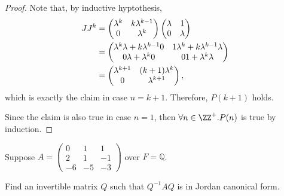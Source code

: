 \documentclass[11pt]{scrartcl}
\begin{document}
\begin{proof}
Note that, by inductive hyptothesis,
\begin{align}
J J^k                                         & = 
        \begin{pmatrix} 
      \lambda^k                               & k\lambda^{k-1}                     \\
      0                                       & \lambda^k
    \end{pmatrix}\left(\begin{matrix} \lambda & 1                                  \\ 0 & 
    \lambda\end{matrix}\right)                                                     \\
                                              & = 
  \begin{pmatrix}
    \lambda^k\lambda +k\lambda^{k-1}\* 0      & 1\*\lambda^k+k\lambda^{k-1}\lambda \\
    0\* \lambda+\lambda^k\* 0                 & 0\*1 + \lambda^k\lambda
  \end{pmatrix}\\
&=
  \begin{pmatrix}
\lambda^{k+1} & (k+1)\lambda^{k}\\
0 & \lambda^{k+1}
  \end{pmatrix},
\end{align}
which is exactly the claim in case $n=k+1$. Therefore, $P(k+1)$ holds.

Since the claim is also true in case $n=1$, then $\forall n \in \ZZ^+. P(n)$ is true by induction.
\end{proof}

\begin{problem*}
\hfill

Suppose
$A = \left(\begin{matrix} 0 & 1 & 1 \\ 2 & 1 & -1 \\ -6 & -5 & -3\end{matrix}\right)$
over $F = \mathbb Q$. 

Find an invertible matrix $Q$ such that $Q^{-1} A Q$ is in Jordan canonical form.
\end{problem*}
\end{document}
